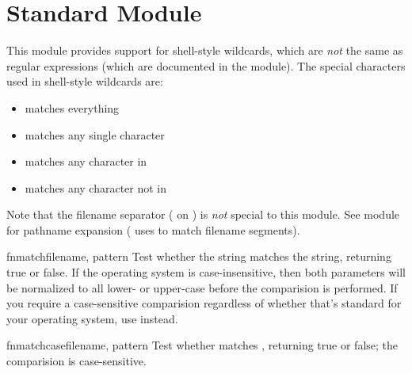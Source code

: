 \section{Standard Module }
\label{module-fnmatch}

This module provides support for \UNIX{} shell-style wildcards, which
are \emph{not} the same as regular expressions (which are documented
in the  module).  The special characters
used in shell-style wildcards are:
\begin{itemize}
\item[\code{*}] matches everything
\item[\code{?}]	matches any single character
\item[\code{[}\var{seq}\code{]}] matches any character in 
\item[\code{[!}\var{seq}\code{]}] matches any character not in 
\end{itemize}

Note that the filename separator ( on \UNIX{}) is \emph{not}
special to this module.  See module 
for pathname expansion ( uses  to
match filename segments).


\begin{funcdesc}{fnmatch}{filename, pattern}
Test whether the  string matches the 
string, returning true or false.  If the operating system is
case-insensitive, then both parameters will be normalized to all
lower- or upper-case before the comparision is performed.  If you
require a case-sensitive comparision regardless of whether that's
standard for your operating system, use  instead.
\end{funcdesc}

\begin{funcdesc}{fnmatchcase}{filename, pattern}
Test whether  matches , returning true or
false; the comparision is case-sensitive.
\end{funcdesc}

\begin{seealso}

\end{seealso}
